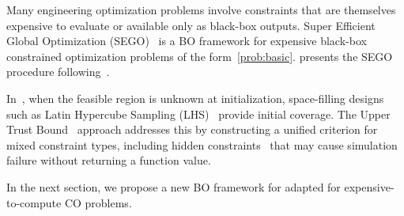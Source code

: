 Many engineering optimization problems involve constraints that are themselves expensive to evaluate or available only as black-box outputs.
Super Efficient Global Optimization (SEGO)~\cite{sasena2002} is a BO framework for expensive black-box constrained optimization problems of the form~\eqref{prob:basic}.  presents the SEGO procedure following~\cite{sasena2002,cordelier2025}.



In~, when the feasible region is unknown at initialization, space-filling designs such as Latin Hypercube Sampling (LHS)~\cite{mckay1979} provide initial coverage. The Upper Trust Bound~\cite{priem2020b} approach addresses this by constructing a unified criterion for mixed constraint types, including hidden constraints~\cite{ledigabel2024} that may cause simulation failure without returning a function value.

In the next section, we propose a new BO framework for adapted for expensive-to-compute CO problems.